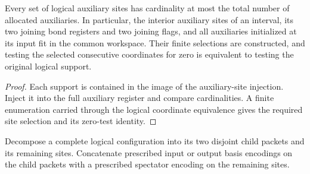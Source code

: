 \begin{lemma}
    \label{thm:mpu_interval_initialization}
    \leanok
    Every set of logical auxiliary sites has cardinality at most the
    total number of allocated auxiliaries. In particular, the interior
    auxiliary sites of an interval, its two joining bond registers and
    two joining flags, and all auxiliaries initialized at its input
    fit in the common workspace. Their finite selections are
    constructed, and testing the selected consecutive coordinates
    for zero is equivalent to testing the original logical support.
\end{lemma}
\begin{proof}\leanok
    Each support is contained in the image of the auxiliary-site
    injection. Inject it into the full auxiliary register and compare
    cardinalities. A finite enumeration carried through the logical
    coordinate equivalence gives the required site selection and its
    zero-test identity.
\end{proof}

\begin{definition}
    \label{def:mpu_joint_child_columns}
    \leanok
    Decompose a complete logical configuration into its two disjoint
    child packets and its remaining sites. Concatenate prescribed
    input or output basis encodings on the child packets with a
    prescribed spectator encoding on the remaining sites.
\end{definition}

